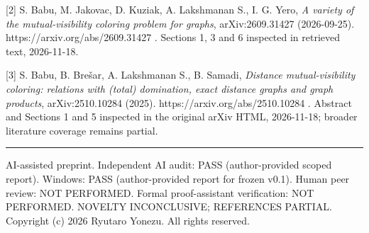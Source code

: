 \documentclass[
  11pt,
]{article}
\begin{document}
{[}2{]} S. Babu, M. Jakovac, D. Kuziak, A. Lakshmanan S., I. G. Yero,
\emph{A variety of the mutual-visibility coloring problem for graphs},
arXiv:2609.31427 (2026-09-25). https://arxiv.org/abs/2609.31427 .
Sections 1, 3 and 6 inspected in retrieved text, 2026-11-18.

{[}3{]} S. Babu, B. Brešar, A. Lakshmanan S., B. Samadi, \emph{Distance
mutual-visibility coloring: relations with (total) domination, exact
distance graphs and graph products}, arXiv:2510.10284 (2025).
https://arxiv.org/abs/2510.10284 . Abstract and Sections 1 and 5
inspected in the original arXiv HTML, 2026-11-18; broader literature
coverage remains partial.

\begin{center}\rule{0.5\linewidth}{0.5pt}\end{center}

AI-assisted preprint. Independent AI audit: PASS (author-provided scoped
report). Windows: PASS (author-provided report for frozen v0.1). Human
peer review: NOT PERFORMED. Formal proof-assistant verification: NOT
PERFORMED. NOVELTY INCONCLUSIVE; REFERENCES PARTIAL. Copyright (c) 2026
Ryutaro Yonezu. All rights reserved.
\end{document}
